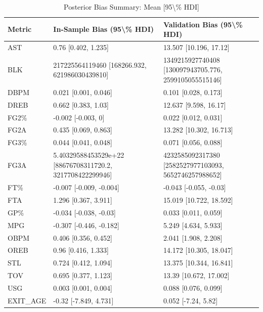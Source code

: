 \begin{table}[t]
\caption*{
{\fontsize{20}{25}\selectfont  Posterior Bias Summary: Mean [95\textbackslash{}\% HDI]\fontsize{12}{15}\selectfont }
} 
\fontsize{12.0pt}{14.0pt}\selectfont
\begin{tabular*}{\linewidth}{@{\extracolsep{\fill}}lll}
\toprule
Metric & In-Sample Bias (95\textbackslash{}\% HDI) & Validation Bias (95\textbackslash{}\% HDI) \\ 
\midrule\addlinespace[2.5pt]
AST & 0.76 [0.402, 1.235] & 13.507 [10.196, 17.12] \\ 
BLK & 217225564119460 [168266.932, 621986030439810] & 1349215927740408 [130097943705.776, 2599105055515146] \\ 
DBPM & 0.021 [0.001, 0.046] & 0.101 [0.028, 0.173] \\ 
DREB & 0.662 [0.383, 1.03] & 12.637 [9.598, 16.17] \\ 
FG2\% & -0.002 [-0.003, 0] & 0.022 [0.012, 0.031] \\ 
FG2A & 0.435 [0.069, 0.863] & 13.282 [10.302, 16.713] \\ 
FG3\% & 0.044 [0.041, 0.048] & 0.071 [0.056, 0.088] \\ 
FG3A & 5.40329588453529e+22 [88676708311720.2, 3217708422299946] & 4232585092317380 [2582527977103093, 5652746257988652] \\ 
FT\% & -0.007 [-0.009, -0.004] & -0.043 [-0.055, -0.03] \\ 
FTA & 1.296 [0.367, 3.911] & 15.019 [10.722, 18.592] \\ 
GP\% & -0.034 [-0.038, -0.03] & 0.033 [0.011, 0.059] \\ 
MPG & -0.307 [-0.446, -0.182] & 5.249 [4.634, 5.933] \\ 
OBPM & 0.406 [0.356, 0.452] & 2.041 [1.908, 2.208] \\ 
OREB & 0.96 [0.416, 1.333] & 14.172 [10.305, 18.047] \\ 
STL & 0.724 [0.412, 1.094] & 13.375 [10.344, 16.841] \\ 
TOV & 0.695 [0.377, 1.123] & 13.39 [10.672, 17.002] \\ 
USG & 0.003 [0.001, 0.004] & 0.088 [0.076, 0.099] \\ 
EXIT\_AGE & -0.32 [-7.849, 4.731] & 0.052 [-7.24, 5.82] \\ 
\bottomrule
\end{tabular*}
\end{table}

